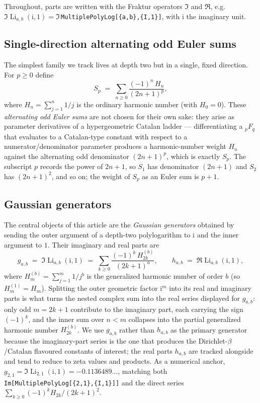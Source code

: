 \documentclass[11pt]{article}
\DeclareMathOperator{\Li}{Li}
\newcommand{\iu}{\mathrm{i}}
\theoremstyle{plain}
\theoremstyle{remark}
\begin{document}
Throughout, parts are written with the Fraktur operators $\Im$ and $\Re$, e.g.\ $\Im\Li_{a,b}(\iu,1)=\Im$\,\texttt{MultiplePolyLog[\{a,b\},\allowbreak\{I,1\}]}, with $\iu$ the imaginary unit.

\subsection{Single-direction alternating odd Euler sums}

The simplest family we track lives at depth two but in a single, fixed direction. For $p\ge 0$ define
\[
  S_p \;=\; \sum_{n\ge 0} \frac{(-1)^{n}\,H_n}{(2n+1)^{p}},
\]
where $H_n=\sum_{j=1}^{n} 1/j$ is the ordinary harmonic number (with $H_0=0$). These \emph{alternating odd Euler sums} are not chosen for their own sake: they arise as parameter derivatives of a hypergeometric Catalan ladder --- differentiating a ${}_p F_q$ that evaluates to a Catalan-type constant with respect to a numerator/denominator parameter produces a harmonic-number weight $H_n$ against the alternating odd denominator $(2n+1)^{p}$, which is exactly $S_p$. The subscript $p$ records the power of $2n+1$, so $S_1$ has denominator $(2n+1)$ and $S_2$ has $(2n+1)^2$, and so on; the weight of $S_p$ as an Euler sum is $p+1$.

\subsection{Gaussian generators}

The central objects of this article are the \emph{Gaussian generators} obtained by sending the outer argument of a depth-two polylogarithm to $\iu$ and the inner argument to $1$. Their imaginary and real parts are
\[
  g_{a,b} \;=\; \Im\Li_{a,b}(\iu,1)
    \;=\; \sum_{k\ge 0} \frac{(-1)^{k}\,H^{(b)}_{2k}}{(2k+1)^{a}},
  \qquad
  h_{a,b} \;=\; \Re\Li_{a,b}(\iu,1),
\]
where $H^{(b)}_{m}=\sum_{j=1}^{m} 1/j^{b}$ is the generalized harmonic number of order $b$ (so $H^{(1)}_m=H_m$). Splitting the outer geometric factor $\iu^{m}$ into its real and imaginary parts is what turns the nested complex sum into the real series displayed for $g_{a,b}$: only odd $m=2k+1$ contribute to the imaginary part, each carrying the sign $(-1)^k$, and the inner sum over $n<m$ collapses into the partial generalized harmonic number $H^{(b)}_{2k}$. We use $g_{a,b}$ rather than $h_{a,b}$ as the primary generator because the imaginary-part series is the one that produces the Dirichlet-$\beta$/Catalan flavoured constants of interest; the real parts $h_{a,b}$ are tracked alongside and tend to reduce to zeta values and products. As a numerical anchor, $g_{2,1}=\Im\Li_{2,1}(\iu,1)=-0.1136489\ldots$, matching both \texttt{Im[MultiplePolyLog[\{2,1\},\allowbreak\{I,1\}]]} and the direct series $\sum_{k\ge 0}(-1)^k H_{2k}/(2k+1)^2$.
\end{document}

